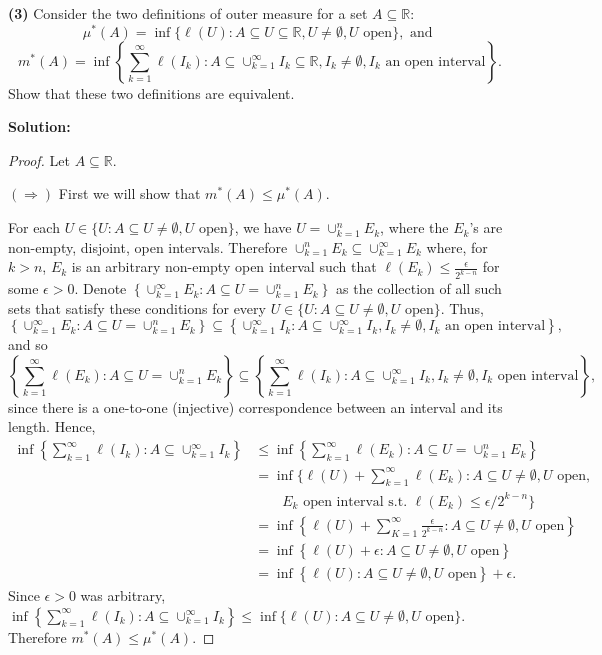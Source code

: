 \documentclass[12pt]{article}
\begin{document}
{\bf (3)} Consider the two definitions of outer measure for a set $A \subseteq
\mathbb{R}$:
\[ \mu^{*}(A) = \inf\{\ell(U) : A \subseteq U \subseteq \mathbb{R}, U \neq
\emptyset, U \text{ open}\}, \text{ and } \]
\[ m^{*}(A) = \inf\left\{\sum_{k=1}^{\infty}\ell(I_{k}) : A \subseteq
\cup_{k=1}^{\infty}I_{k} \subseteq \mathbb{R}, I_{k} \neq \emptyset, I_{k}
\text{ an open interval}\right\}. \]
Show that these two definitions are equivalent.

{\bf Solution:}

\begin{proof}
Let $A \subseteq \mathbb{R}$. 

$(\Rightarrow)$ First we will show that $m^{*}(A) \leq \mu^{*}(A)$.

For each $U \in \{U:A \subseteq U \neq \emptyset, U \text{ open}\}$, we have $U = \cup_{k=1}^{n}E_{k}$, where
the $E_{k}$'s are non-empty, disjoint, open intervals. Therefore
$\cup_{k=1}^{n}E_{k}
\subseteq \cup_{k=1}^{\infty}E_{k}$ where, for $k > n$, $E_{k}$ is an arbitrary
non-empty open interval such that $\ell(E_{k}) \leq \frac{\epsilon}{2^{k-n}}$
for some $\epsilon > 0$.
Denote $\left\{\cup_{k=1}^{\infty}E_{k}:A\subseteq U = \cup_{k=1}^{n}E_{k}\right\}$ as the collection of all
such sets that satisfy these conditions for every $U \in \{U:A \subseteq U \neq \emptyset, U \text{ open}\}$.
Thus, 
\[ \left\{ \cup_{k=1}^{\infty}E_{k}:A\subseteq U = \cup_{k=1}^{n}E_{k}\right\} \subseteq
\left\{\cup_{k=1}^{\infty}I_{k}: A \subseteq
\cup_{k=1}^{\infty}I_{k}, I_{k} \neq \emptyset, I_{k}
\text{ an open interval}\right\}, \]
 and so 
\[ \left\{\sum_{k=1}^{\infty}\ell(E_{k}):A\subseteq U = \cup_{k=1}^{n}E_{k}\right\} \subseteq
\left\{\sum_{k=1}^{\infty}\ell(I_{k}): A \subseteq
\cup_{k=1}^{\infty}I_{k}, I_{k}\neq \emptyset, I_{k}\text{ open interval}\right\}, \]
since there is a one-to-one (injective) correspondence between an interval and its length. Hence, 
\begin{align*}
\inf\left\{\sum_{k=1}^{\infty}\ell(I_{k}): A \subseteq
\cup_{k=1}^{\infty}I_{k}\right\} & \leq
\inf\left\{\sum_{k=1}^{\infty}\ell(E_{k}):A\subseteq U = \cup_{k=1}^{n}E_{k}\right\} \\
& = \inf\bigg\{\ell(U) +
\sum_{k=1}^{\infty}\ell(E_{k}):A \subseteq U \neq \emptyset, U \text{ open}, \\
& \qquad E_{k}\text{ open interval s.t. } \ell(E_{k}) \leq \epsilon / 2^{k-n}\bigg\} \\
& = \inf\left\{\ell(U) +
\sum_{K=1}^{\infty}\frac{\epsilon}{2^{k-n}}:A \subseteq U \neq \emptyset, U \text{ open}\right\} \\
& = \inf\left\{\ell(U) + \epsilon :A \subseteq U \neq \emptyset, U \text{ open}\right\} \\
& = \inf\left\{\ell(U):A \subseteq U \neq \emptyset, U \text{ open}\right\} + \epsilon. 
\end{align*}
Since $\epsilon > 0$ was arbitrary,
$\inf\left\{\sum_{k=1}^{\infty}\ell(I_{k}): A \subseteq
\cup_{k=1}^{\infty}I_{k}\right\} \leq \inf\{\ell(U):A
\subseteq U \neq \emptyset, U \text{ open}\}$.
Therefore $m^{*}(A) \leq \mu^{*}(A)$.


\end{proof}
\end{document}

